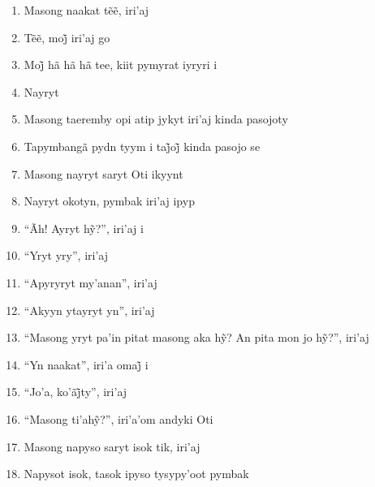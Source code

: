 \begin{enumerate}
 \item Masong naakat tẽẽ, iri’aj

 \begin{center}\end{center}

 \item Tẽẽ, moj̃ iri’aj go

 \item Moj̃ hã hã hã tee, kiit pymyrat iyryri i

 \item Nayryt

 \item Masong taeremby opi atip jykyt iri'aj kinda pasojoty

 \item Tapymbangã pydn tyym i taj̃oj̃ kinda pasojo se

 \item Masong nayryt saryt Oti ikyynt

 \item Nayryt okotyn, pymbak iri'aj ipyp

 \begin{center}\end{center}

 \item ``Ãh! Ayryt hỹ?'', iri’aj i

 \item ``Yryt yry'', iri'aj

 \item ``Apyryryt my'anan'', iri'aj

 \item ``Akyyn ytayryt yn'', iri'aj

 \item ``Masong yryt pa’in pitat masong aka hỹ? An pita mon jo hỹ?'', iri’aj

 \item ``Yn naakat'', iri’a omaj̃ i

 \item ``Jo’a, ko’ãj̃ty'', iri’aj

 \item ``Masong ti’ahỹ?'', iri’a’om andyki Oti

 \begin{center}\end{center}

 \item Masong napyso saryt isok tik, iri'aj

 \item Napysot isok, tasok ipyso tysypy'oot pymbak


\end{enumerate}
